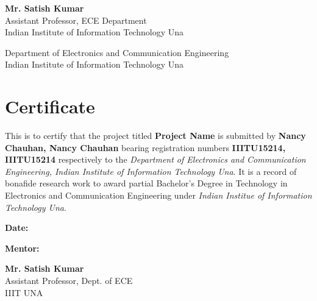 \documentclass[a4paper,12 pt,oneside]{book}
\begin{document}
\begin{titlepage}
\begin{center}
        \textbf{Mr. Satish Kumar}\\
        Assistant Professor, ECE Department\\
        Indian Institute of Information Technology Una
 
        \vspace{2.35cm}
        
        \large
 
        Department of Electronics and Communication Engineering\\
        Indian Institute of Information Technology Una\\
      
    \end{center}
\end{titlepage}

\chapter*{\centering Certificate}

This is to certify that the project titled \textbf{Project Name} is submitted by \textbf{Nancy Chauhan, Nancy Chauhan} bearing registration numbers \textbf{IIITU15214, IIITU15214} respectively to the \textit{Department of Electronics and Communication Engineering, Indian Institute of Information Technology Una}. It is a record of bonafide research work to award partial Bachelor’s Degree in Technology in Electronics and Communication Engineering under \textit{Indian Institue of Information Technology Una}.

\vspace{2cm}

\noindent\textbf{Date:}

\vspace{1cm}

\begin{multicols}{2}
    \noindent
    \begin{varwidth}{\textwidth}
    \textbf{Mentor:}
    \end{varwidth}
    
    \columnbreak
    
    \hfill
    \begin{varwidth}{\textwidth}
        \textbf{Mr. Satish Kumar}\\
        Assistant Professor, Dept. of ECE\\
        IIIT UNA
        
        \end{varwidth}
    
    

\end{multicols}
\end{document}
